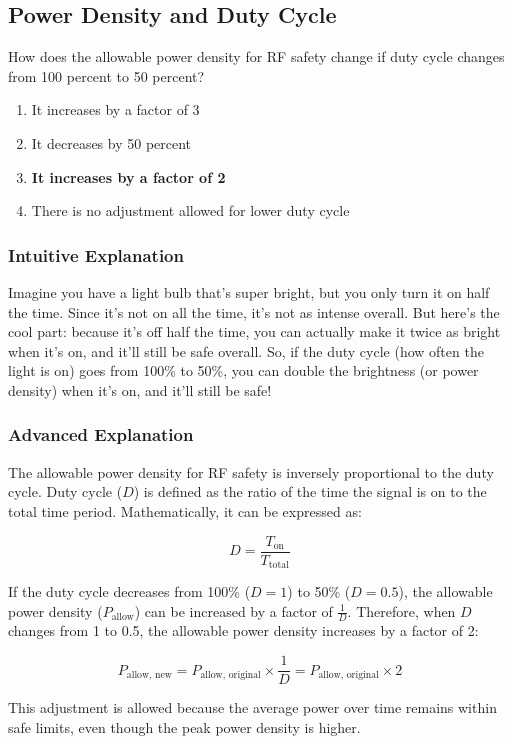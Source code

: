 \subsection{Power Density and Duty Cycle}
\label{T0C03}

\begin{tcolorbox}[colback=gray!10!white,colframe=black!75!black,title=T0C03]
How does the allowable power density for RF safety change if duty cycle changes from 100 percent to 50 percent?
\begin{enumerate}[label=\Alph*]
    \item It increases by a factor of 3
    \item It decreases by 50 percent
    \item \textbf{It increases by a factor of 2}
    \item There is no adjustment allowed for lower duty cycle
\end{enumerate}
\end{tcolorbox}

\subsubsection{Intuitive Explanation}
Imagine you have a light bulb that’s super bright, but you only turn it on half the time. Since it’s not on all the time, it’s not as intense overall. But here’s the cool part: because it’s off half the time, you can actually make it twice as bright when it’s on, and it’ll still be safe overall. So, if the duty cycle (how often the light is on) goes from 100\% to 50\%, you can double the brightness (or power density) when it’s on, and it’ll still be safe!

\subsubsection{Advanced Explanation}
The allowable power density for RF safety is inversely proportional to the duty cycle. Duty cycle (\(D\)) is defined as the ratio of the time the signal is on to the total time period. Mathematically, it can be expressed as:

\[
D = \frac{T_{\text{on}}}{T_{\text{total}}}
\]

If the duty cycle decreases from 100\% (\(D = 1\)) to 50\% (\(D = 0.5\)), the allowable power density (\(P_{\text{allow}}\)) can be increased by a factor of \( \frac{1}{D} \). Therefore, when \(D\) changes from 1 to 0.5, the allowable power density increases by a factor of 2:

\[
P_{\text{allow, new}} = P_{\text{allow, original}} \times \frac{1}{D} = P_{\text{allow, original}} \times 2
\]

This adjustment is allowed because the average power over time remains within safe limits, even though the peak power density is higher.

